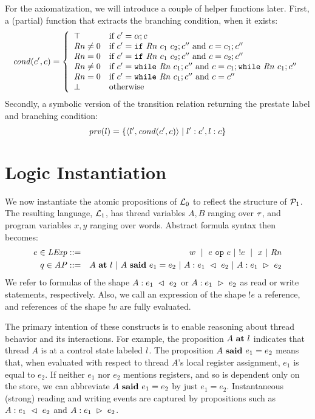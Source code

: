%
For the axiomatization, we will introduce a couple of helper functions later. First, a (partial) function that extracts the branching condition, when it exists:
\[
\mathit{cond}(c',c) =
\left\{
\begin{array}{ll}
\top & \mbox{if }c' = \alpha;c \\
\mathit{Rn}\neq 0 & \mbox{if }c'=\texttt{if}\ \mathit{Rn}\ c_1\ c_2 ; c'' \mbox{ and }c=c_1;c'' \\
\mathit{Rn} = 0 & \mbox{if }c'=\texttt{if}\ \mathit{Rn}\ c_1\ c_2 ; c'' \mbox{ and }c=c_2;c'' \\
\mathit{Rn}\neq 0 & \mbox{if }c'=\texttt{while}\ \mathit{Rn}\ c_1 ; c'' \mbox{ and }c=c_1; \texttt{while}\ \mathit{Rn}\ c_1 ; c'' \\
\mathit{Rn} = 0 & \mbox{if }c'=\texttt{while}\ \mathit{Rn}\ c_1 ; c'' \mbox{ and }c=c'' \\
\bot & \mbox{otherwise}
\end{array}
\right.
\]
%
Secondly, a symbolic version of the transition relation returning the prestate label and branching condition:
\[
\mathit{prv}(l) = \{\langle l',\mathit{cond}(c',c) \rangle \mid l':c', l:c\}
\] 
%

\section{Logic Instantiation}
%
 We now instantiate the atomic propositions of $\mathcal{L}_0$ to reflect the structure of $\mathcal{P}_1$. The resulting language, $\mathcal{L}_1$, has thread variables $A,B$ ranging over $\tau$, and program variables $x,y$ ranging over words. 
%
Abstract formula syntax then becomes:
\begin{eqnarray*}
e\in\mathit{LExp} & ::= & w\ \mid\ e\ \texttt{op}\ e\ |\ !e\ \mid\ x\ |\ \mathit{Rn} \\
q\in\mathit{AP} & ::= & A\ \mathbf{at}\ l\ |\ A\ \mathbf{said}\ e_1 = e_2\ |\ A: e_1\ \lhd\ e_2\ |\ A:e_1\ \rhd\ e_2
\end{eqnarray*}
%
We refer to formulas of the shape $A: e_1\ \ReadFrom\ e_2$ or $A:e_1\ \WriteTo\ e_2$ as read or write statements, respectively. Also, we call an expression of the shape $!e$ a reference, and references of the shape $!w$ are fully evaluated.


The primary intention of these constructs is to enable reasoning about thread behavior and its interactions. For example, the proposition $A\ \mathbf{at}\ l$ indicates that thread $A$ is at a control state labeled $l$. The proposition $A\ \mathbf{said}\ e_1 = e_2$ means that, when evaluated with respect to thread $A$'s local register assignment, $e_1$ is equal to $e_2$. If neither $e_1$ nor $e_2$ mentions registers, and so is dependent only on the store, we can abbreviate $A\ \mathbf{said}\ e_1 = e_2$ by just $e_1 = e_2$. 
%
Instantaneous (strong) reading and writing events are captured by propositions such as $A: e_1\ \ReadFrom\ e_2$ and $A:e_1\ \WriteTo\ e_2$.


